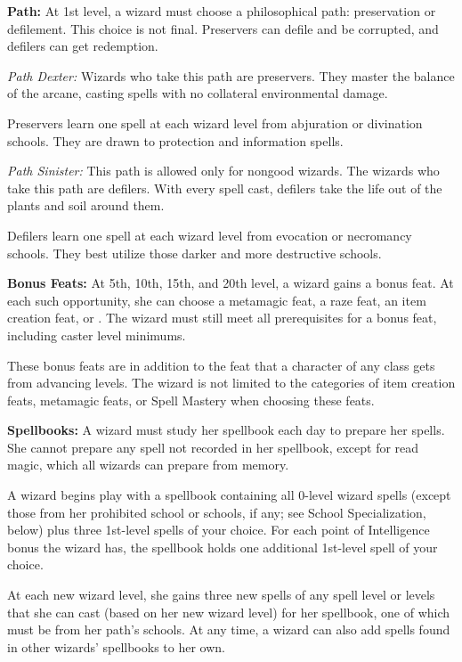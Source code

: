 \textbf{Path:} At 1st level, a wizard must choose a philosophical path: preservation or defilement. This choice is not final. Preservers can defile and be corrupted, and defilers can get redemption.

\textit{Path Dexter:} Wizards who take this path are preservers. They master the balance of the arcane, casting spells with no collateral environmental damage.

Preservers learn one spell at each wizard level from abjuration or divination schools. They are drawn to protection and information spells.

\textit{Path Sinister:} This path is allowed only for nongood wizards. The wizards who take this path are defilers. With every spell cast, defilers take the life out of the plants and soil around them.

Defilers learn one spell at each wizard level from evocation or necromancy schools. They best utilize those darker and more destructive schools.

\textbf{Bonus Feats:} At 5th, 10th, 15th, and 20th level, a wizard gains a bonus feat. At each such opportunity, she can choose a metamagic feat, a raze feat, an item creation feat, or . The wizard must still meet all prerequisites for a bonus feat, including caster level minimums.

These bonus feats are in addition to the feat that a character of any class gets from advancing levels. The wizard is not limited to the categories of item creation feats, metamagic feats, or Spell Mastery when choosing these feats.

\textbf{Spellbooks:} A wizard must study her spellbook each day to prepare her spells. She cannot prepare any spell not recorded in her spellbook, except for read magic, which all wizards can prepare from memory.

A wizard begins play with a spellbook containing all 0-level wizard spells (except those from her prohibited school or schools, if any; see School Specialization, below) plus three 1st-level spells of your choice. For each point of Intelligence bonus the wizard has, the spellbook holds one additional 1st-level spell of your choice.

At each new wizard level, she gains three new spells of any spell level or levels that she can cast (based on her new wizard level) for her spellbook, one of which must be from her path's schools. At any time, a wizard can also add spells found in other wizards' spellbooks to her own.

